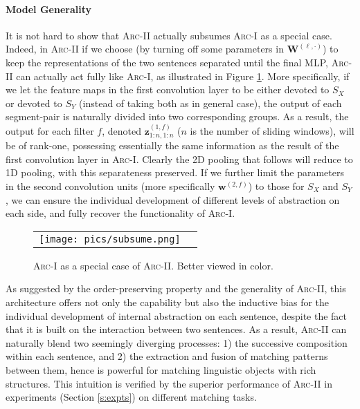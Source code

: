 \documentclass{article} \usepackage{nips14submit_e,times}
\newcommand{\W}{\ensuremath{\mathbf{W}}}
\newcommand{\w}{\ensuremath{\mathbf{w}}}
\newcommand{\z}{\ensuremath{\mathbf{z}}}
\newcommand{\0}{\ensuremath{\mathbf{0}}}
\newcommand{\1}{\ensuremath{\mathbf{1}}}
\begin{document}
\paragraph{Model Generality} It is not hard to show that \textsc{Arc-II} actually subsumes \textsc{Arc-I} as a special case. Indeed, in \textsc{Arc-II} if we choose (by turning off some parameters in $\W^{(\ell,\cdot)}$) to keep the representations of the two sentences separated until the final MLP, \textsc{Arc-II} can actually act fully like \textsc{Arc-I}, as illustrated in Figure \ref{f:specialcase}. More specifically, if we let the feature maps in the first convolution layer to be either devoted to $S_X$ or devoted to $S_Y$ (instead of taking both as in general case), the output of each segment-pair is naturally divided into two corresponding groups. As a result, the output for each filter $f$, denoted $\z^{(1, f)}_{1:n,1:n}$ ($n$ is the number of sliding windows), will be of rank-one, possessing essentially the same information as the result of the first convolution layer in \textsc{Arc-I}. Clearly the 2D pooling that follows will reduce to 1D pooling, with this separateness preserved. If we further limit the parameters in the second convolution units (more specifically $\w^{(2,f)}$) to those for $S_X$ and $S_Y$, we can ensure the individual  development of different levels of abstraction on each side, and fully recover the functionality of \textsc{Arc-I}.


\begin{figure}[h!]
\begin{center}
    \begin{tabular}[c]{cc}
\texttt{[image: pics/subsume.png]}
      \hspace{160pt}
\end{tabular}
\vspace{-10pt}
    \caption{\textsc{Arc-I} as a special case of \textsc{Arc-II}. Better viewed in color.}
    \label{f:specialcase}
  \end{center}
\end{figure}
\newpage
As suggested by the order-preserving property and the generality of \textsc{Arc-II}, this architecture offers not only the capability but also the inductive bias for the individual development of internal abstraction on each sentence, despite the fact that it is built on the interaction between two sentences. As a result, \textsc{Arc-II} can naturally blend two seemingly diverging processes: 1) the successive composition within each sentence, and 2) the extraction and fusion of matching patterns between them, hence is powerful for matching linguistic objects with rich structures. This intuition is verified by the superior performance of \textsc{Arc-II} in experiments (Section \ref{s:expts}) on different matching tasks.
\end{document}
